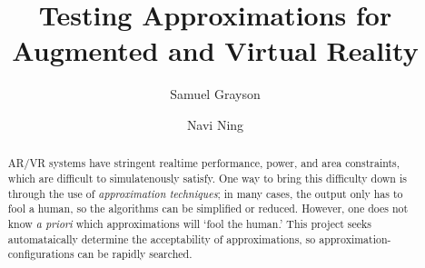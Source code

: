 \documentclass[sigconf,screen]{acmart}
\begin{document}
\title{Testing Approximations for Augmented and Virtual Reality}

\author{Samuel Grayson}

\author{Navi Ning}

\renewcommand\footnotetextcopyrightpermission[1]{} %

\newcommand{\todo}[1]{\textcolor{red}{#1}}

\begin{abstract}
AR/VR systems have stringent realtime performance, power, and area constraints, which are difficult to simulatenously satisfy.
One way to bring this difficulty down is through the use of \textit{approximation techniques};
    in many cases, the output only has to fool a human, so the algorithms can be simplified or reduced.
However, one does not know \textit{a priori} which approximations will `fool the human.'
This project seeks automataically determine the acceptability of approximations, so approximation-configurations can be rapidly searched.
\end{abstract}




\maketitle





\end{document}
